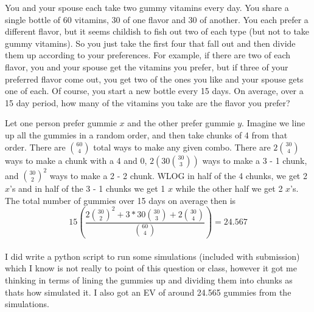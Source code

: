 \documentclass[12pt]{article}
\author{Warren Atkison}
\date{\today}
\newenvironment{exercise}[2][Exercise]{\begin{trivlist}
\item[\hskip \labelsep {\bfseries #1} \hskip \labelsep {\bfseries #2.}]}{\end{trivlist}}
\begin{document}
\fancyhf{}
\fancyhead[R]{\today}
\fancyfoot[R]{\thepage}

\begin{exercise}{1.5.7 (3pt)}
	You and your spouse each take two gummy vitamins every day. You share a single bottle of 60 vitamins, 30 of one flavor and 30 of another. You each prefer a different flavor, but it seems childish to fish out two of each type (but not to take gummy vitamins). So you just take the first four that fall out and then divide them up according to your preferences. For example, if there are two of each flavor, you and your spouse get the vitamins you prefer, but if three of your preferred flavor come out, you get two of the ones you like and your spouse gets one of each. Of course, you start a new bottle every 15 days. On average, over a 15 day period, how many of the vitamins you take are the flavor you prefer? 
\end{exercise}
Let one person prefer gummie $x$ and the other prefer gummie $y$. Imagine we line up all the gummies in a random order, and then take chunks of 4 from that order. There are $\binom{60}{4}$ total ways to make any given combo. There are $2\binom{30}{4}$ ways to make a chunk with a 4 and 0, $2(30\binom{30}{3})$ ways to make a 3 - 1 chunk, and $\binom{30}{2}^2$ ways to make a 2 - 2 chunk. WLOG in half of the 4 chunks, we get 2 $x$'s and in half of the 3 - 1 chunks we get 1 $x$ while the other half we get 2 $x$'s. The total number of gummies over 15 days on average then is
\[
	15(\dfrac{2\binom{30}{2}^2 + 3*30\binom{30}{3} + 2\binom{30}{4}}{\binom{60}{4}}) = 24.567
\]
\paragraph*{}
I did write a python script to run some simulations (included with submission) which I know is not really to point of this question or class, however it got me thinking in terms of lining the gummies up and dividing them into chunks as thats how simulated it. I also got an EV of around 24.565 gummies from the simulations.
\end{document}

